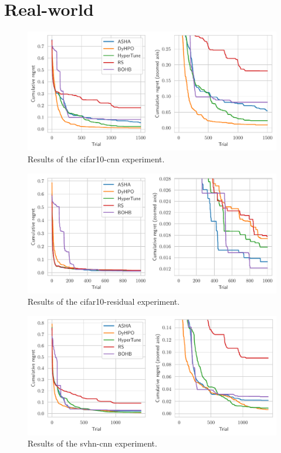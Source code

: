 \section{Real-world}


\begin{figure}[H]
    \centering
    \includegraphics[scale=0.65]{img/real_exp/cifar10_simple_regret_plot.pdf}
    \caption{Results of the cifar10-cnn experiment.}
    \label{fig:cifar10_simple}
\end{figure}

\begin{figure}[H]
    \centering
    \includegraphics[scale=0.65]{img/real_exp/cifar10_residual_regret_plot.pdf}
    \caption{Results of the cifar10-residual experiment.}
    \label{fig:cifar10_residual}
\end{figure}

\begin{figure}[H]
    \centering
    \includegraphics[scale=0.65]{img/real_exp/svhn_simple_regret_plot.pdf}
    \caption{Results of the svhn-cnn experiment.}
    \label{fig:svhn_simple}
\end{figure}


